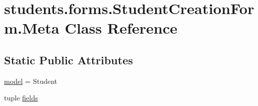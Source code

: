 \hypertarget{classstudents_1_1forms_1_1_student_creation_form_1_1_meta}{\section{students.\-forms.\-Student\-Creation\-Form.\-Meta Class Reference}
\label{classstudents_1_1forms_1_1_student_creation_form_1_1_meta}
}
\subsection*{Static Public Attributes}
\begin{DoxyCompactItemize}
\item 
\hyperlink{classstudents_1_1forms_1_1_student_creation_form_1_1_meta_a0d17a78a3c180d59e19729155599b5f7}{model} = Student
\item 
tuple \hyperlink{classstudents_1_1forms_1_1_student_creation_form_1_1_meta_a7ebad25429c662d6ca0793ac8fbb3fed}{fields}
\end{DoxyCompactItemize}


